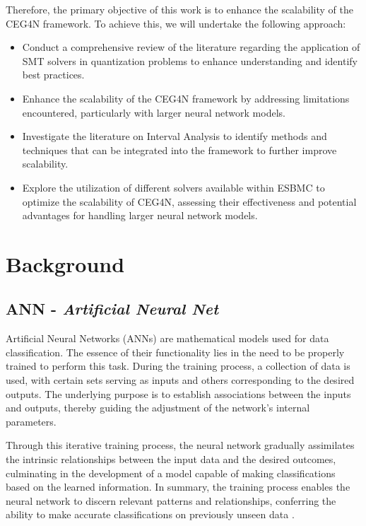 \documentclass[conference]{IEEEtran}
\begin{document}
Therefore, the primary objective of this work is to enhance the scalability of the CEG4N framework. To achieve this, we will undertake the following approach:
\begin{itemize}
    \item Conduct a comprehensive review of the literature regarding the application of SMT solvers in quantization problems to enhance understanding and identify best practices.
    \item Enhance the scalability of the CEG4N framework by addressing limitations encountered, particularly with larger neural network models.
    \item Investigate the literature on Interval Analysis to identify methods and techniques that can be integrated into the framework to further improve scalability.
    \item Explore the utilization of different solvers available within ESBMC to optimize the scalability of CEG4N, assessing their effectiveness and potential advantages for handling larger neural network models.
\end{itemize}


\section{Background}

\subsection{ANN - \textit{Artificial Neural Net}}
Artificial Neural Networks (ANNs) are mathematical models used for data classification. The essence of their functionality lies in the need to be properly trained to perform this task. During the training process, a collection of data is used, with certain sets serving as inputs and others corresponding to the desired outputs. The underlying purpose is to establish associations between the inputs and outputs, thereby guiding the adjustment of the network's internal parameters.

Through this iterative training process, the neural network gradually assimilates the intrinsic relationships between the input data and the desired outcomes, culminating in the development of a model capable of making classifications based on the learned information. In summary, the training process enables the neural network to discern relevant patterns and relationships, conferring the ability to make accurate classifications on previously unseen data \cite{state-art-ann}.
\end{document}
